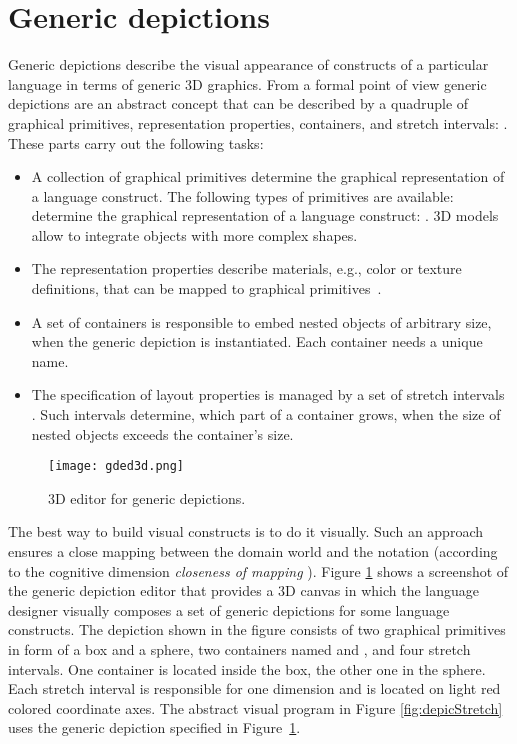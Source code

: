 \documentclass[a4paper]{article}
\begin{document}
\section{Generic depictions}
\label{sec:genDepic}
Generic depictions describe the visual appearance of constructs of a particular language in terms of generic 3D graphics.
From a formal point of view generic depictions are an abstract concept that can be described by a quadruple of graphical primitives, representation properties, containers, and stretch intervals: . These parts carry out the following tasks:

\begin{itemize}
  \item A collection of graphical primitives  determine the graphical representation of a language construct. The following types of primitives are available:   determine the graphical representation of a language construct:  . 3D models allow to integrate objects with more complex shapes.
  \item The representation properties  describe materials, e.g., color or texture definitions, that can be mapped to graphical primitives~.
  \item A set of containers  is responsible to embed nested objects of arbitrary size, when the generic depiction is instantiated. Each container needs a unique name.
  \item The specification of layout properties is managed by a set of stretch intervals . Such intervals determine, which part of a container grows, when the size of nested objects exceeds the container's size.
\end{itemize}

\begin{figure}[!ht]
  \centering
  \texttt{[image: gded3d.png]}
  \caption{3D editor for generic depictions.}
  \label{fig:gded3d}
\end{figure}

The best way to build visual constructs is to do it visually. Such an approach ensures a close mapping between the domain world and the notation (according to the cognitive dimension \emph{closeness of mapping} \cite{GP96}). Figure \ref{fig:gded3d} shows a screenshot of the generic depiction editor that provides a 3D canvas in which the language designer visually composes a set of generic depictions for some language constructs. The depiction shown in the figure consists of two graphical primitives in form of a box and a sphere, two containers named  and , and four stretch intervals. One container is located inside the box, the other one in the sphere. Each stretch interval is responsible for one dimension and is located on light red colored coordinate axes. The abstract visual program in Figure \ref{fig:depicStretch} uses the generic depiction specified in Figure~\ref{fig:gded3d}.
\end{document}
